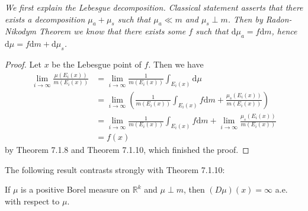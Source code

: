 \begin{note}\em
We first explain the Lebesgue decomposition. Classical statement asserts that there exists a decomposition $\mu_a+\mu_s$ such that $\mu_a\ll m$ and $\mu_s\perp m$. Then by Radon-Nikodym Theorem we know that there exists some $f$ such that $\mathrm{d}\mu_a=f\mathrm{d}m$, hence $\mathrm{d}\mu=f\mathrm{d}m+\mathrm{d}\mu_s$.
\end{note}
\begin{proof}
Let $x$ be the Lebesgue point of $f$. Then we have 
$$
\begin{aligned}
\lim_{i\rightarrow \infty} \frac{\mu \left( E_i\left( x \right) \right)}{m\left( E_i\left( x \right) \right)}&=\lim_{i\rightarrow \infty} \frac{1}{m\left( E_i\left( x \right) \right)}\int_{E_i\left( x \right)}{\mathrm{d}\mu}
\\
&=\lim_{i\rightarrow \infty} \left( \frac{1}{m\left( E_i\left( x \right) \right)}\int_{E_i\left( x \right)}{f\mathrm{d}m}+\frac{\mu _s\left( E_i\left( x \right) \right)}{m\left( E_i\left( x \right) \right)} \right) 
\\
&=\lim_{i\rightarrow \infty} \frac{1}{m\left( E_i\left( x \right) \right)}\int_{E_i\left( x \right)}{f\mathrm{d}m}+\lim_{i\rightarrow \infty} \frac{\mu _s\left( E_i\left( x \right) \right)}{m\left( E_i\left( x \right) \right)}
\\
&=f\left( x \right) 
\end{aligned}
$$
by Theorem 7.1.8 and Theorem 7.1.10, which finished the proof.
\end{proof}
The following result contrasts strongly with Theorem 7.1.10:
\begin{theorem}
If $\mu$ is a positive Borel measure on $\mathbb{R}^k$ and $\mu\perp m$, then $(D\mu)(x)=\infty$ a.e. with respect to $\mu$.
\end{theorem}
